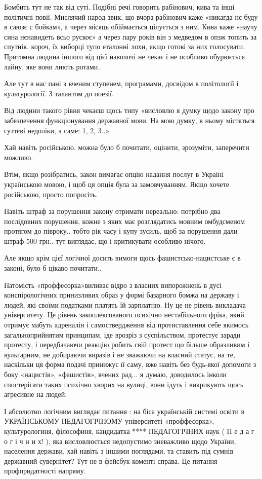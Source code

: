 \begin{itemize}
Бомбить тут не так від суті. Подібні речі говорить рабінович, кива та інші
політичні повії. Мислячий народ звик, що вчора рабінович каже «никагда нє буду
в саюзє с бойкам», а через місяць обіймається цілується з ним. Кива каже «научу
сина нєнавидеть всьо рускоє» а через пару років він з медведом в опзж топить за
спутнік. короч, їх виборці тупо еталонні лохи, якщо готові за них голосувати.
Притомна людина іншого від цієї наволочі не чекає і не особливо обурюється
лайну, яке вони лиють ротами..

Але тут в нас пані з вченим ступенем, програмами, досвідом в політології і культурології. З талантом до поезії.

Від людини такого рівня чекаєш щось типу «висловлю я думку щодо закону про
забезпечення функціонування державної мови. На мою думку, в ньому містяться
суттєві недоліки, а саме: 1, 2, 3..»

Хай навіть російською. можна було б почитати, оцінити, зрозуміти, заперечити можливо.

Втім, якщо розібратись, закон вимагає опцію надання послуг в Україні
українською мовою, і щоб ця опція була за замовчуванням. Якщо хочете
російською, просто попросіть.

Навіть штраф за порушення закону отримати нереально: потрібно два послідовних
порушення, кожне з яких має розглядатись мовним омбудсменом протягом до
півроку.. тобто рік часу і купу зусиль, щоб за порушення дали штраф 500 грн..
тут виглядає, що і критикувати особливо нічого.

Але якщо крім цієї логічної досить вимоги щось фашистсько-нацистське є в
законі, було б цікаво почитати..

Натомість «проффесорка»виливає відро з власних випорожнень в дусі
конспірологічних принизливих образ у формі базарного бомжа на державу і людей,
які своїми податками платять їй зарплатню. Ну це не рівень викладача
університету. Це рівень закоплексованого психічно нестабільного фріка, який
отримує мабуть адреналін і самоствердження від протиставлення себе якимось
загальноприйнятим принципам, іде врозріз з суспільством, протестує заради
протесту, і передбачаючи реакцію робить свій протест що більше образливим і
вульгарним, не добираючи виразів і не зважаючи на власний статус, на те,
наскільки ця форма подачі принижує її саму, вже навіть без будь-якої допомоги з
боку «нацистів», «фашистів», вчених рад... я думаю, доводилось інколи
спостерігати таких психічно хворих на вулиці, вони ідуть і викрикують щось
агресивне на людей.

І абсолютно логічним виглядає питання : на біса українській системі освіти в
УКРАЇНСЬКОМУ ПЕДАГОГІЧНОМУ університеті «проффесорка», культурологиня,
філософиня, кандидатка **** ПЕДАГОГІЧНИХ наук ( П е д а г о г і ч н и х! ), яка
висловлюється недопустимо зневажливо щодо України, населення держави, хай
навіть з іншими поглядами, та ставить під сумнів державний сувернітет? Тут не в
фейсбук коменті справа. 
Це питання профпридатності напряму.


\end{itemize}
